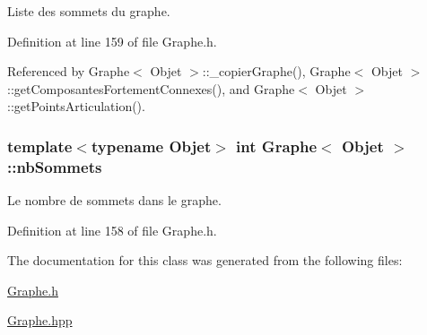 Liste des sommets du graphe. 



Definition at line 159 of file Graphe.h.



Referenced by Graphe$<$ Objet $>$::\_\-copierGraphe(), Graphe$<$ Objet $>$::getComposantesFortementConnexes(), and Graphe$<$ Objet $>$::getPointsArticulation().

\hypertarget{class_graphe_a68b553a71b69dba498e36aa2f22525af}{
\subsubsection[{nbSommets}]{\setlength{\rightskip}{0pt plus 5cm}template$<$typename Objet$>$ int {\bf Graphe}$<$ Objet $>$::{\bf nbSommets}}}
\label{class_graphe_a68b553a71b69dba498e36aa2f22525af}


Le nombre de sommets dans le graphe. 



Definition at line 158 of file Graphe.h.



The documentation for this class was generated from the following files:\begin{DoxyCompactItemize}
\item 
\hyperlink{_graphe_8h}{Graphe.h}\item 
\hyperlink{_graphe_8hpp}{Graphe.hpp}\end{DoxyCompactItemize}
